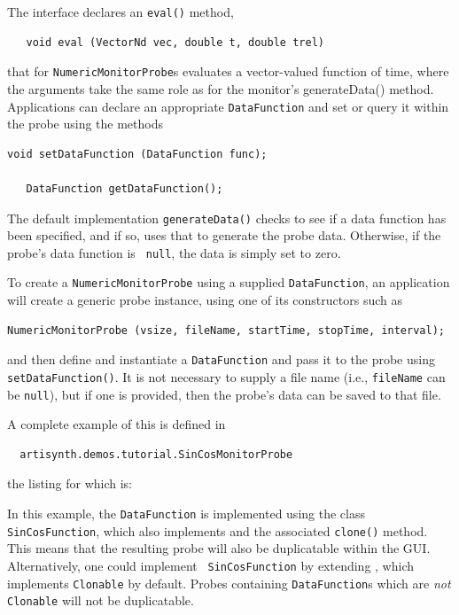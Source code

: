 The  interface
declares an {\tt eval()} method,
%
\begin{verbatim}
   void eval (VectorNd vec, double t, double trel)
\end{verbatim}
%
that for 
{\tt NumericMonitorProbe}s
evaluates a vector-valued function of time,
where the arguments take the same role as for the monitor's %
{generateData()}
method. Applications can declare an appropriate {\tt DataFunction} and
set or query it within the probe using the methods
%
\begin{lstlisting}[]
   void setDataFunction (DataFunction func);

   DataFunction getDataFunction();
\end{lstlisting}
%
The default implementation {\tt generateData()} checks to see
if a data function has been specified, and if so, uses that to
generate the probe data. Otherwise, if the probe's data function is {\tt
null}, the data is simply set to zero.

To create a {\tt NumericMonitorProbe} using a supplied {\tt DataFunction},
an application will create a generic probe instance, using one
of its constructors such as 
%
\begin{lstlisting}[]
   NumericMonitorProbe (vsize, fileName, startTime, stopTime, interval);
\end{lstlisting}
%
and then define and instantiate a {\tt DataFunction} and pass it to
the probe using {\tt setDataFunction()}. It is not necessary to supply
a file name (i.e., {\tt fileName} can be {\tt null}), but if one is
provided, then the probe's data can be saved to that file.

A complete example
of this is defined in
%
\begin{verbatim}
  artisynth.demos.tutorial.SinCosMonitorProbe
\end{verbatim}
%
the listing for which is:

\lstset{numbers=left}

\lstset{numbers=none}

In this example, the {\tt DataFunction} is implemented using the class
{\tt SinCosFunction}, which also implements
 and the associated {\tt clone()}
method. This means that the resulting probe will also be duplicatable
within the GUI. Alternatively, one could implement {\tt
SinCosFunction} by extending
, which implements
{\tt Clonable} by default. Probes containing {\tt DataFunction}s
which are {\it not} {\tt Clonable} will not be duplicatable.

